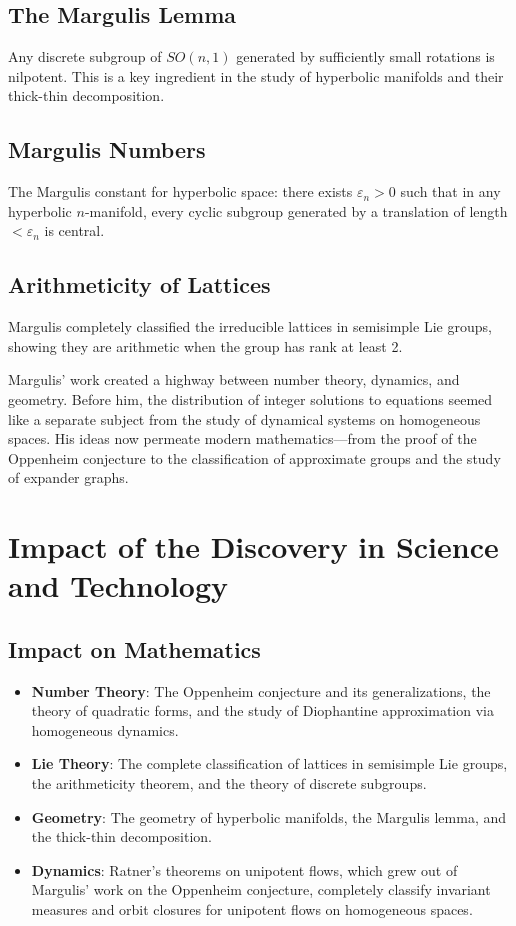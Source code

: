 \subsection{The Margulis Lemma}
Any discrete subgroup of $SO(n,1)$ generated by sufficiently small rotations is nilpotent. This is a key ingredient in the study of hyperbolic manifolds and their thick-thin decomposition.

\subsection{Margulis Numbers}
The Margulis constant for hyperbolic space: there exists $\varepsilon_n > 0$ such that in any hyperbolic $n$-manifold, every cyclic subgroup generated by a translation of length $<\varepsilon_n$ is central.

\subsection{Arithmeticity of Lattices}
Margulis completely classified the irreducible lattices in semisimple Lie groups, showing they are arithmetic when the group has rank at least 2.

\begin{whyitmatters}
Margulis' work created a highway between number theory, dynamics, and geometry. Before him, the distribution of integer solutions to equations seemed like a separate subject from the study of dynamical systems on homogeneous spaces. His ideas now permeate modern mathematics---from the proof of the Oppenheim conjecture to the classification of approximate groups and the study of expander graphs.
\end{whyitmatters}

\section{Impact of the Discovery in Science and Technology}

\subsection{Impact on Mathematics}

\begin{itemize}
\item \textbf{Number Theory}: The Oppenheim conjecture and its generalizations, the theory of quadratic forms, and the study of Diophantine approximation via homogeneous dynamics.
\item \textbf{Lie Theory}: The complete classification of lattices in semisimple Lie groups, the arithmeticity theorem, and the theory of discrete subgroups.
\item \textbf{Geometry}: The geometry of hyperbolic manifolds, the Margulis lemma, and the thick-thin decomposition.
\item \textbf{Dynamics}: Ratner's theorems on unipotent flows, which grew out of Margulis' work on the Oppenheim conjecture, completely classify invariant measures and orbit closures for unipotent flows on homogeneous spaces.
\end{itemize}

